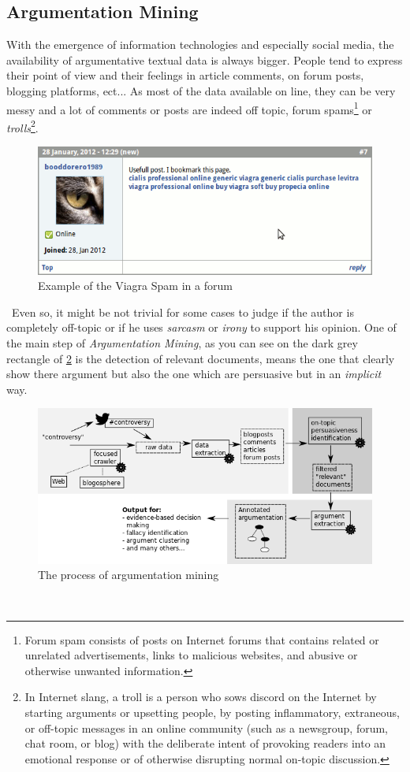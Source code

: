 \subsection{Argumentation Mining}
With the emergence of information technologies and especially social media, the availability of argumentative textual data is always bigger. People tend to express their point of view and their feelings in article comments, on forum posts, blogging platforms, ect... As most of the data available on line, they can be very messy and a lot of comments or posts are indeed off topic, forum spams\footnote{Forum spam consists of posts on Internet forums that contains related or unrelated advertisements, links to malicious websites, and abusive or otherwise unwanted information.} or \emph{trolls}\footnote{In Internet slang, a troll is a person who sows discord on the Internet by starting arguments or upsetting people, by posting inflammatory, extraneous, or off-topic messages in an online community (such as a newsgroup, forum, chat room, or blog) with the deliberate intent of provoking readers into an emotional response or of otherwise disrupting normal on-topic discussion.}. 
\
\begin{figure}[H]
    \centering
    \includegraphics[width=1\textwidth]{fig/spam.png}
    \caption[Short caption]{Example of the Viagra Spam in a forum}
    \label{fig:forumspam}
\end{figure}
\
Even so, it might be not trivial for some cases to judge if the author is completely off-topic or if he uses \emph{sarcasm} or \emph{irony} to support his opinion. One of the main step of \emph{Argumentation Mining}, as you can see on the dark grey rectangle of \cref{fig:argmining} is the detection of relevant documents, means the one that clearly show there argument but also the one which are persuasive but in an \emph{implicit} way.
\
\begin{figure}[H]
    \centering
    \includegraphics[width=1\textwidth]{fig/overview.png}
    \caption[Short caption]{The process of argumentation mining}
    \label{fig:argmining}
\end{figure}
\

